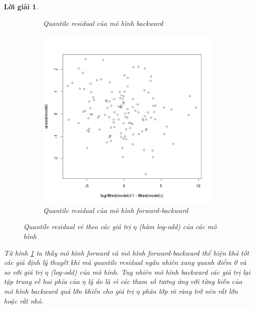 \documentclass[14pt, a4paper]{article}
\theoremstyle{sltheorem}
\theoremstyle{soltheorem}
\newtheorem*{loigiai}{Lời giải}
\begin{document}
\begin{loigiai}
\begin{figure}[h!]
\begin{subfigure}[b]{0.4\linewidth}
            \caption{Quantile residual của mô hình backward}
        \end{subfigure}
        \hfill
        \begin{subfigure}[b]{0.4\textwidth}
            \centering
            \includegraphics[width=1.0\linewidth]{figures/mbo_fitted.png}
            \caption{Quantile residual của mô hình forward-backward}
        \end{subfigure}
        \caption{Quantile residual vẽ theo các giá trị $\eta$ (hàm log-odd) của các mô hình}
        \label{fig:Quantile-fitted}
    \end{figure}

    Từ hình \ref{fig:Quantile-fitted} ta thấy mô hình forward và mô hình forward-backward thể hiện khá tốt các giả định lý thuyết khi mà quantile residual ngẫu nhiên xung quanh điểm 0 và so với giá trị $\eta$ (log-odd) của mô hình.
    Tuy nhiên mô hình backward các giá trị lại tập trung về hai phía của $\eta$ lý do là vì các tham số tương ứng với từng biến của mô hình backward quá lớn khiến cho giá trị $\eta$ phân lớp rõ ràng trở nên rất lớn hoặc rất nhỏ.


\end{loigiai}
\end{document}
